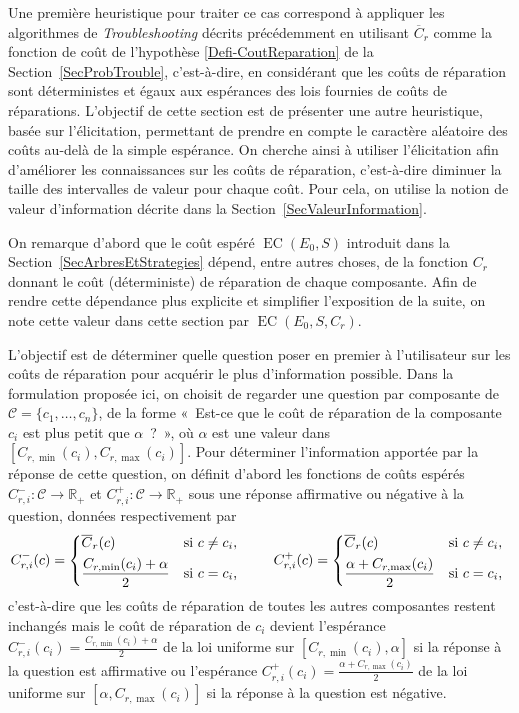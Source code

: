 \documentclass[a4paper,11pt]{article}
\theoremstyle{plain}
\theoremstyle{definition}
\DeclareMathOperator{\EC}{EC}
\begin{document}
Une première heuristique pour traiter ce cas correspond à appliquer les algorithmes de \emph{Troubleshooting} décrits précédemment en utilisant $\overline C_r$ comme la fonction de coût de l'hypothèse \ref{Defi-CoutReparation} de la Section~\ref{SecProbTrouble}, c'est-à-dire, en considérant que les coûts de réparation sont déterministes et égaux aux espérances des lois fournies de coûts de réparations. L'objectif de cette section est de présenter une autre heuristique, basée sur l'élicitation, permettant de prendre en compte le caractère aléatoire des coûts au-delà de la simple espérance. On cherche ainsi à utiliser l'élicitation afin d'améliorer les connaissances sur les coûts de réparation, c'est-à-dire diminuer la taille des intervalles de valeur pour chaque coût. Pour cela, on utilise la notion de valeur d'information décrite dans la Section~\ref{SecValeurInformation}.

On remarque d'abord que le coût espéré $\EC(E_0, S)$ introduit dans la Section~\ref{SecArbresEtStrategies} dépend, entre autres choses, de la fonction $C_r$ donnant le coût (déterministe) de réparation de chaque composante. Afin de rendre cette dépendance plus explicite et simplifier l'exposition de la suite, on note cette valeur dans cette section par $\EC(E_0, S, C_r)$.

L'objectif est de déterminer quelle question poser en premier à l'utilisateur sur les coûts de réparation pour acquérir le plus d'information possible. Dans la formulation proposée ici, on choisit de regarder une question par composante de $\mathcal C = \{c_1, \dotsc, c_n\}$, de la forme «~Est-ce que le coût de réparation de la composante $c_i$ est plus petit que $\alpha$~?~», où $\alpha$ est une valeur dans $[C_{r, \min}(c_i), C_{r, \max}(c_i)]$. Pour déterminer l'information apportée par la réponse de cette question, on définit d'abord les fonctions de coûts espérés $C_{r, i}^-: \mathcal C \to \mathbb R_+$ et $C_{r, i}^+: \mathcal C \to \mathbb R_+$ sous une réponse affirmative ou négative à la question, données respectivement par
\begin{equation}
\label{EqDefiCpm}
C_{r, i}^-(c) = \begin{dcases*}
\overline C_r(c) & si $c \neq c_i$, \\
\frac{C_{r, \min}(c_i) + \alpha}{2} & si $c = c_i$,
\end{dcases*} \qquad C_{r, i}^+(c) = \begin{dcases*}
\overline C_r(c) & si $c \neq c_i$, \\
\frac{\alpha + C_{r, \max}(c_i)}{2} & si $c = c_i$,
\end{dcases*}
\end{equation}
c'est-à-dire que les coûts de réparation de toutes les autres composantes restent inchangés mais le coût de réparation de $c_i$ devient l'espérance $C_{r, i}^-(c_i) = \frac{C_{r, \min}(c_i) + \alpha}{2}$ de la loi uniforme sur $[C_{r, \min}(c_i), \alpha]$ si la réponse à la question est affirmative ou l'espérance $C_{r, i}^+(c_i) = \frac{\alpha + C_{r, \max}(c_i)}{2}$ de la loi uniforme sur $[\alpha, C_{r, \max}(c_i)]$ si la réponse à la question est négative.
\end{document}
